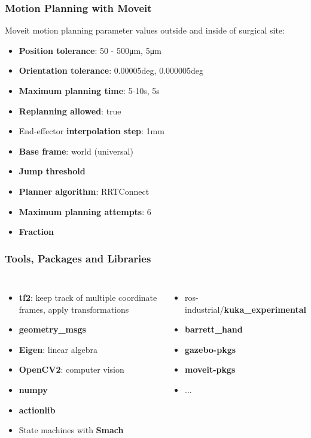 \begin{frame}
\frametitle{Motion Planning with Moveit}
Moveit motion planning parameter values outside and inside of surgical site:
\begin{itemize}
	\item \textbf{Position tolerance}: 50 - 500μm, 5μm
	\item \textbf{Orientation tolerance}: 0.00005deg, 0.000005deg
	\item \textbf{Maximum planning time}: 5-10s, 5s
	\item \textbf{Replanning allowed}: true
	\item End-effector \textbf{interpolation step}: 1mm
	\item \textbf{Base frame}: world (universal)
	\item \textbf{Jump threshold}
	\item \textbf{Planner algorithm}: RRTConnect
	\item \textbf{Maximum planning attempts}: 6
	\item \textbf{Fraction}
\end{itemize}
\end{frame}

\begin{frame}
\frametitle{Tools, Packages and Libraries}
\begin{columns}
\begin{itemize}
\item \textbf{tf2}: keep track of multiple coordinate frames, apply transformations
\item \textbf{geometry\_msgs}
\item \textbf{Eigen}: linear algebra
\item \textbf{OpenCV2}: computer vision
\item \textbf{numpy}
\item \textbf{actionlib}
\item State machines with \textbf{Smach}
\end{itemize}

\begin{itemize}
\item  ros-industrial/\textbf{kuka\_experimental }
\item \textbf{barrett\_hand}
\item \textbf{gazebo-pkgs}
\item \textbf{moveit-pkgs}
\item ...
\end{itemize}
\end{columns}
\end{frame}